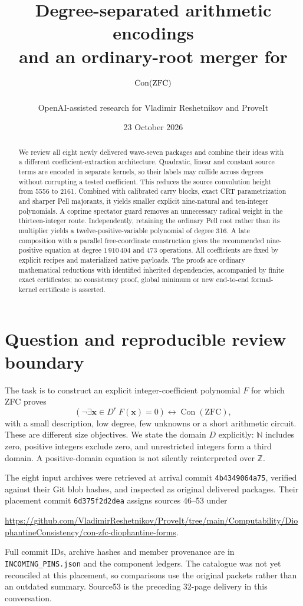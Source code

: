 \documentclass[11pt]{article}
\title{Degree-separated arithmetic encodings\\and an ordinary-root merger for $\Con(\mathrm{ZFC})$}
\author{OpenAI-assisted research for Vladimir Reshetnikov and ProveIt}
\date{23 October 2026}
\newcommand{\Z}{\mathbb Z}\newcommand{\N}{\mathbb N}
\newcommand{\Con}{\operatorname{Con}}
\begin{document}
\maketitle
\begin{abstract}
We review all eight newly delivered wave-seven packages and combine their
ideas with a different coefficient-extraction architecture. Quadratic,
linear and constant source terms are encoded in separate kernels, so their
labels may collide across degrees without corrupting a tested coefficient.
This reduces the source convolution height from 5556 to 2161. Combined
with calibrated carry blocks, exact CRT parametrization and sharper Pell
majorants, it yields smaller explicit nine-natural and ten-integer
polynomials. A coprime spectator guard removes an unnecessary radical
weight in the thirteen-integer route. Independently, retaining the ordinary
Pell root rather than its multiplier yields a twelve-positive-variable
polynomial of degree 316. A late composition with a parallel free-coordinate
construction gives the recommended nine-positive equation at degree
$1\,910\,404$ and 473 operations. All coefficients are fixed by explicit recipes
and materialized native payloads. The proofs are ordinary mathematical
reductions with identified inherited dependencies, accompanied by finite
exact certificates; no consistency proof, global minimum or new
end-to-end formal-kernel certificate is asserted.
\end{abstract}

\section{Question and reproducible review boundary}
The task is to construct an explicit integer-coefficient polynomial $F$
for which ZFC proves
\[
 \left(\neg\exists\mathbf x\in D^r\ F(\mathbf x)=0\right)
 \longleftrightarrow\Con(\mathrm{ZFC}),
\]
with a small description, low degree, few unknowns or a short arithmetic
circuit. These are different size objectives. We state the domain $D$
explicitly: $\N$ includes zero, positive integers exclude zero, and
unrestricted integers form a third domain. A positive-domain equation is
not silently reinterpreted over $\Z$.

The eight input archives were retrieved at arrival commit
\texttt{4b4349064a75}, verified against their Git blob hashes, and inspected
as original delivered packages. Their placement commit
\texttt{6d375f2d2dea} assigns sources 46--53 under
\begin{center}\small
\url{https://github.com/VladimirReshetnikov/ProveIt/tree/main/Computability/DiophantineConsistency/con-zfc-diophantine-forms}.
\end{center}
Full commit IDs, archive hashes and member provenance are in
\texttt{INCOMING\_PINS.json} and the component ledgers. The catalogue was
not yet reconciled at this placement, so comparisons use the original
packets rather than an outdated summary. Source53 is the preceding
32-page delivery in this conversation.
\end{document}
